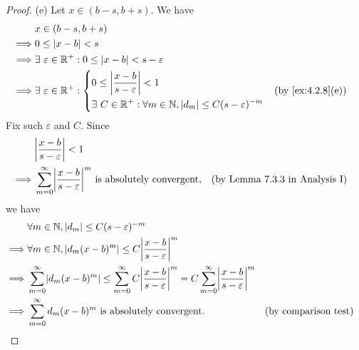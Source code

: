 \begin{proof}{(e)}
  Let \(x \in (b - s, b + s)\).
  We have
  \begin{align*}
             & x \in (b - s, b + s)                                                                                           \\
    \implies & 0 \leq \abs{x - b} < s                                                                                         \\
    \implies & \exists\ \varepsilon \in \R^+ : 0 \leq \abs{x - b} < s - \varepsilon                                           \\
    \implies & \exists\ \varepsilon \in \R^+ : \begin{dcases}
                                                 0 \leq \abs{\dfrac{x - b}{s - \varepsilon}} < 1 \\
                                                 \exists\ C \in \R^+ : \forall m \in \N, \abs{d_m} \leq C (s - \varepsilon)^{-m}
                                               \end{dcases} &  & \text{(by \cref{ex:4.2.8}(e))}
  \end{align*}
  Fix such \(\varepsilon\) and \(C\).
  Since
  \begin{align*}
             & \abs{\dfrac{x - b}{s - \varepsilon}} < 1                                                                                                \\
    \implies & \sum_{m = 0}^\infty \abs{\dfrac{x - b}{s - \varepsilon}}^m \text{ is absolutely convergent}, &  & \text{(by Lemma 7.3.3 in Analysis I)}
  \end{align*}
  we have
  \begin{align*}
             & \forall m \in \N, \abs{d_m} \leq C (s - \varepsilon)^{-m}                                                                                                                                                     \\
    \implies & \forall m \in \N, \abs{d_m (x - b)^m} \leq C \abs{\dfrac{x - b}{s - \varepsilon}}^{m}                                                                                                                         \\
    \implies & \sum_{m = 0}^\infty \abs{d_m (x - b)^m} \leq \sum_{m = 0}^\infty C \abs{\dfrac{x - b}{s - \varepsilon}}^{m} = C \sum_{m = 0}^\infty \abs{\dfrac{x - b}{s - \varepsilon}}^{m}                                  \\
    \implies & \sum_{m = 0}^\infty d_m (x - b)^m \text{ is absolutely convergent}.                                                                                                          &  & \text{(by comparison test)}

\end{align*}
\end{proof}
